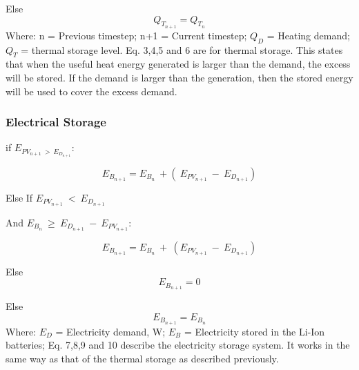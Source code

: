 Else 
\begin{equation}
Q_{T_{n+1}} = Q_{T_{n}}
\end{equation}
\newline
Where:
n = Previous timestep;\newline
n+1 = Current timestep;\newline
$Q_D$ = Heating demand;\newline
$Q_T$ = thermal storage level.\newline
\newline
Eq. 3,4,5 and 6 are for thermal storage. This states that when the useful heat energy generated is larger than the demand, the excess will be stored. If the demand is larger than the generation, then the stored energy will be used to cover the excess demand. 

\subsubsection{Electrical Storage}

if $E_{PV_{n+1} \ > \ E_{D_{n+1}}}$:

\begin{equation}
E_{B_{n+1}} = E_{B_n} \ + (\ E_{PV_{n+1}} \ - \ E_{D_{n+1}}) 
\end{equation}

Else If $E_{PV_{n+1}} \ < \ E_{D_{n+1}}$ \newline

\hspace*{15pt} \vspace*{2pt} And $E_{B_n} \ \geq \ E_{D_{n+1}} \ - \ E_{PV_{n+1}}$:

\begin{equation}
E_{B_{n+1}} =E_{B_{n}} \ + \ (E_{PV_{n+1}} \ - \ E_{D_{n+1}})
\end{equation}

\hspace*{15pt} Else 
\begin{equation}
E_{B_{n+1}} = 0
\end{equation}

Else 
\begin{equation}
E_{B_{n+1}} = E_{B_{n}}
\end{equation}
\newline
Where:
$E_D$ = Electricity demand, W;\newline
$E_B$ = Electricity stored in the Li-Ion batteries;\newline
\newline
Eq. 7,8,9 and 10 describe the electricity storage system. It works in the same way as that of the thermal storage as described previously. 


